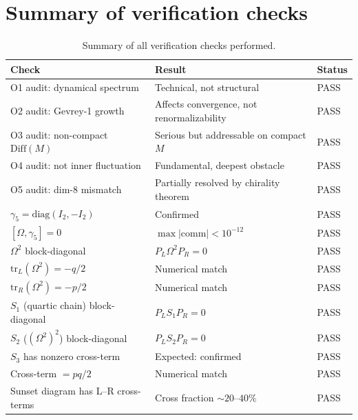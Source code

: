 \documentclass[11pt,a4paper]{article}
\newcommand{\tr}{\mathrm{tr}}
\theoremstyle{definition}
\begin{document}
\section{Summary of verification checks}\label{sec:checks}

\begin{table}[h]
\centering
\caption{Summary of all verification checks performed.}
\label{tab:checks}
\begin{tabular}{lll}
\toprule
\textbf{Check} & \textbf{Result} & \textbf{Status} \\
\midrule
O1 audit: dynamical spectrum
  & Technical, not structural & \textcolor{proven}{PASS} \\
O2 audit: Gevrey-1 growth
  & Affects convergence, not renormalizability & \textcolor{proven}{PASS} \\
O3 audit: non-compact $\mathrm{Diff}(M)$
  & Serious but addressable on compact $M$ & \textcolor{proven}{PASS} \\
O4 audit: not inner fluctuation
  & Fundamental, deepest obstacle & \textcolor{proven}{PASS} \\
O5 audit: dim-8 mismatch
  & Partially resolved by chirality theorem & \textcolor{proven}{PASS} \\
\midrule
$\gamma_5 = \mathrm{diag}(I_2, -I_2)$
  & Confirmed & \textcolor{proven}{PASS} \\
$[\Omega, \gamma_5] = 0$
  & $\max|\mathrm{comm}| < 10^{-12}$ & \textcolor{proven}{PASS} \\
$\Omega^2$ block-diagonal
  & $P_L \Omega^2 P_R = 0$ & \textcolor{proven}{PASS} \\
$\tr_L(\Omega^2) = -q/2$
  & Numerical match & \textcolor{proven}{PASS} \\
$\tr_R(\Omega^2) = -p/2$
  & Numerical match & \textcolor{proven}{PASS} \\
\midrule
$S_1$ (quartic chain) block-diagonal
  & $P_L S_1 P_R = 0$ & \textcolor{proven}{PASS} \\
$S_2$ ($({\Omega^2})^2$) block-diagonal
  & $P_L S_2 P_R = 0$ & \textcolor{proven}{PASS} \\
$S_3$ has nonzero cross-term
  & Expected: confirmed & \textcolor{proven}{PASS} \\
Cross-term $= pq/2$
  & Numerical match & \textcolor{proven}{PASS} \\
\midrule
Sunset diagram has L--R cross-terms
  & Cross fraction $\sim 20$--$40\%$ & \textcolor{proven}{PASS} \\

\end{tabular}
\end{table}
\end{document}
